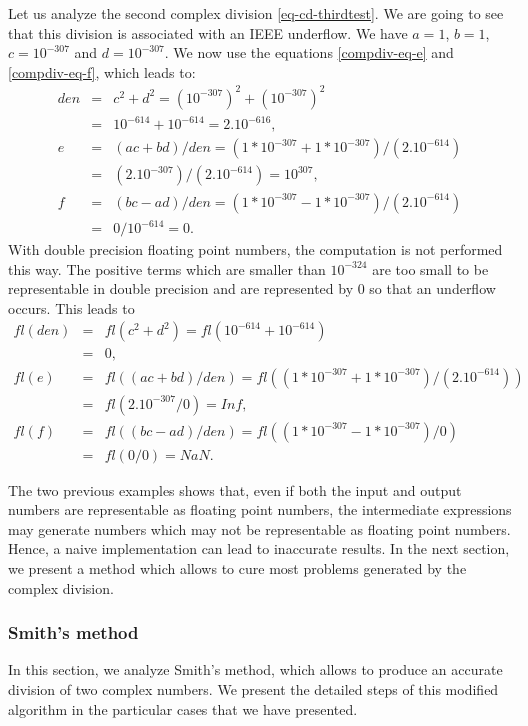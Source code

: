 Let us analyze the second complex division \ref{eq-cd-thirdtest}.
We are going to see that this division is associated with 
an IEEE underflow.
We have $a=1$, $b=1$, $c=10^{-307}$ and $d=10^{-307}$.
We now use the equations \ref{compdiv-eq-e} and \ref{compdiv-eq-f}, which leads to:
\begin{eqnarray}
den &=& c^2 + d^2 = (10^{-307})^2 + (10^{-307})^2 \\
  &=& 10^{-614} + 10^{-614} = 2 . 10^{-616}, \\
e &=& (ac + bd)/ den = (1*10^{-307} + 1*10^{-307})/(2 . 10^{-614}) \\
 &=&  (2 . 10^{-307})/(2 . 10^{-614}) = 10^{307}, \\
f &=& (bc - ad)/ den = (1*10^{-307} - 1*10^{-307})/(2 . 10^{-614}) \\
  &=& 0/10^{-614} = 0.
\end{eqnarray}
With double precision floating point numbers, the computation is not performed this way.
The positive terms which are smaller than $10^{-324}$ are too small to be representable 
in double precision and are represented by 0 so that an underflow occurs.
This leads to
\begin{eqnarray}
fl(den) &=& fl(c^2 + d^2) = fl(10^{-614} + 10^{-614}) \\
&=& 0, \\
fl(e) &=& fl((ac + bd)/ den) = fl((1*10^{-307} + 1*10^{-307})/(2 . 10^{-614}))  \\
&=& fl( 2. 10^{-307}/0 ) = Inf, \\
fl(f) &=& fl((bc - ad)/ den) = fl((1*10^{-307} - 1*10^{-307})/0)  \\
&=& fl(0/0) = NaN.
\end{eqnarray}

The two previous examples shows that, even if both the input and output numbers are 
representable as floating point numbers, the intermediate expressions 
may generate numbers which may not be representable as floating point 
numbers. Hence, a naive implementation can lead to inaccurate results.
In the next section, we present a method which allows to cure most 
problems generated by the complex division.

\subsubsection{Smith's method}

In this section, we analyze Smith's method, which allows to produce an accurate 
division of two complex numbers. We present the detailed steps of this modified 
algorithm in the particular cases that we have presented.

